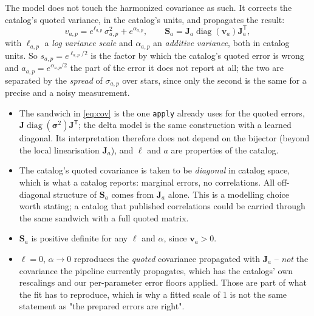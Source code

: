 \documentclass[11pt,a4paper]{article}
\newcommand{\bv}[1]{\boldsymbol{#1}}          %
\newcommand{\bM}[1]{\boldsymbol{#1}}          %
\newcommand{\T}{^{\mathsf T}}
\newcommand{\diag}{\operatorname{diag}}
\begin{document}
The model does not touch the harmonized covariance as such. It corrects the
catalog's quoted variance, in the catalog's units, and propagates the result:
\begin{equation}
  v_{a,p} = e^{\ell_{a,p}}\,\sigma_{a,p}^2 + e^{\alpha_{a,p}},
  \qquad
  \bM S_a = \bM J_a \diag(\bv v_a)\bM J_a\T ,
  \label{eq:cov}
\end{equation}
with $\ell_{a,p}$ a \emph{log variance scale} and $\alpha_{a,p}$ an
\emph{additive variance}, both in catalog units. So
$s_{a,p} = e^{\ell_{a,p}/2}$ is the factor by which the catalog's quoted error
is wrong and $a_{a,p} = e^{\alpha_{a,p}/2}$ the part of the error it does not
report at all; the two are separated by the \emph{spread} of $\sigma_{a,p}$ over
stars, since only the second is the same for a precise and a noisy measurement.
\begin{itemize}
  \item The sandwich in \eqref{eq:cov} is the one \texttt{apply} already uses for
the quoted errors, $\bM J\diag(\bv\sigma^2)\bM J\T$; the delta model is the same
construction with a learned diagonal. Its interpretation therefore does not
depend on the bijector (beyond the local linearisation $\bM J_a$), and $\ell$ and
$a$ are properties of the catalog.
  \item The catalog's quoted covariance is taken to be \emph{diagonal} in
catalog space, which is what a catalog reports: marginal errors, no correlations.
All off-diagonal structure of $\bM S_a$ comes from $\bM J_a$ alone. This is a
modelling choice worth stating; a catalog that published correlations could be
carried through the same sandwich with a full quoted matrix.
  \item $\bM S_a$ is positive definite for any $\ell$ and $\alpha$, since
$\bv v_a > 0$.
  \item $\ell = 0$, $\alpha \to 0$ reproduces the \emph{quoted} covariance
propagated with $\bM J_a$ -- \emph{not} the covariance the pipeline currently
propagates, which has the catalogs' own rescalings and our per-parameter error
floors applied. Those are part of what the fit has to reproduce, which is why a
fitted scale of 1 is not the same statement as "the prepared errors are right".
\end{itemize}
\end{document}
